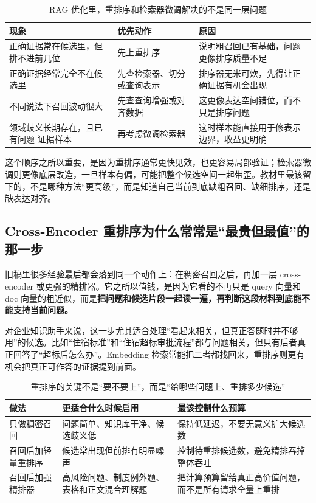 \begin{table}[H]
\centering
\small
\begin{tabularx}{\textwidth}{>{\raggedright\arraybackslash}p{3.2cm}>{\raggedright\arraybackslash}p{2.8cm}>{\raggedright\arraybackslash}X}
\toprule
\textbf{现象} & \textbf{优先动作} & \textbf{原因} \\
\midrule
正确证据常在候选里，但排不进前几位 & 先上重排序 & 说明粗召回已有基础，问题更像排序质量不足 \\
正确证据经常完全不在候选里 & 先查检索器、切分或查询表示 & 排序器无米可炊，先得让正确证据有机会出现 \\
不同说法下召回波动很大 & 先查查询增强或对齐数据 & 这更像表达空间错位，而不只是排序问题 \\
领域歧义长期存在，且已有问题-证据样本 & 再考虑微调检索器 & 这时样本能直接用于修表示边界，收益更明确 \\
\bottomrule
\end{tabularx}
\caption{RAG 优化里，重排序和检索器微调解决的不是同一层问题}
\label{tab:rerank-vs-retriever}
\end{table}

这个顺序之所以重要，是因为重排序通常更快见效，也更容易局部验证；检索器微调则更像底层改造，一旦样本有偏，可能把整个候选空间一起带歪。教材里最该留下的，不是哪种方法“更高级”，而是知道自己当前到底缺粗召回、缺细排序，还是缺表达对齐。

\subsection{Cross-Encoder 重排序为什么常常是“最贵但最值”的那一步}
旧稿里很多经验最后都会落到同一个动作上：在稠密召回之后，再加一层 cross-encoder 或更强的精排器。它之所以值钱，是因为它看的不再只是 query 向量和 doc 向量的粗近似，而是\textbf{把问题和候选片段一起读一遍，再判断这段材料到底能不能支持当前问题。}

对企业知识助手来说，这一步尤其适合处理“看起来相关，但真正答题时并不够用”的候选。比如“住宿标准”和“住宿超标审批流程”都与问题相关，但只有后者真正回答了“超标后怎么办”。Embedding 检索常能把二者都找回来，重排序则更有机会把真正可作答的证据提到前面。

\begin{table}[H]
\centering
\small
\begin{tabularx}{\textwidth}{>{\raggedright\arraybackslash}p{2.8cm}>{\raggedright\arraybackslash}p{3cm}>{\raggedright\arraybackslash}X}
\toprule
\textbf{做法} & \textbf{更适合什么时候启用} & \textbf{最该控制什么预算} \\
\midrule
只做稠密召回 & 问题简单、知识库干净、候选歧义低 & 保持低延迟，不要无意义扩大候选数 \\
召回后加轻量重排序 & 候选常出现但前排有明显噪声 & 控制待重排候选数，避免精排吞掉整体吞吐 \\
召回后加强精排器 & 高风险问题、制度例外题、表格和正文混合理解题 & 把计算预算留给真正高价值问题，而不是所有请求全量上重排 \\
\bottomrule
\end{tabularx}
\caption{重排序的关键不是“要不要上”，而是“给哪些问题上、重排多少候选”}
\label{tab:rerank-budget}
\end{table}

